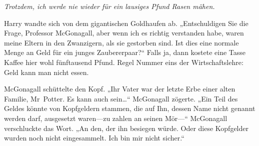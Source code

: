 \emph{Trotzdem, ich werde nie wieder für ein lausiges Pfund Rasen mähen.}

Harry wandte sich von dem gigantischen Goldhaufen ab. „Entschuldigen Sie die Frage, Professor McGonagall, aber wenn ich es richtig verstanden habe, waren meine Eltern in den Zwanzigern, als sie gestorben sind. Ist dies eine normale Menge an Geld für ein junges Zaubererpaar?“ Falls ja, dann kostete eine Tasse Kaffee hier wohl fünftausend Pfund. Regel Nummer eins der Wirtschaftslehre: Geld kann man nicht essen.

McGonagall schüttelte den Kopf. „Ihr Vater war der letzte Erbe einer alten Familie, Mr~Potter. Es kann auch sein…“ McGonagall zögerte. „Ein Teil des Geldes könnte von Kopfgeldern stammen, die auf Ihn, dessen Name nicht genannt werden darf, ausgesetzt waren—zu zahlen an seinen Mör—“ McGonagall verschluckte das Wort. „An den, der ihn besiegen würde. Oder diese Kopfgelder wurden noch nicht eingesammelt. Ich bin mir nicht sicher.“

